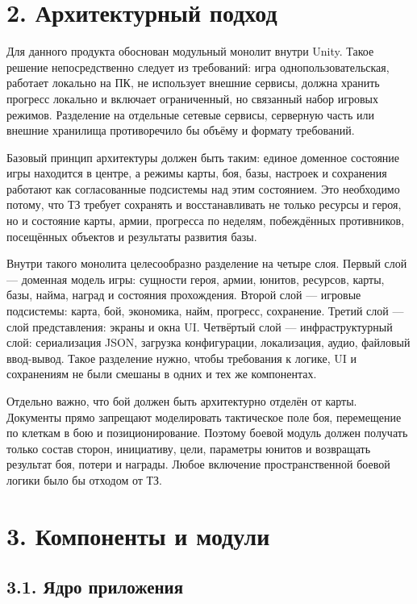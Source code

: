 \documentclass[12pt,a4paper]{article}
\begin{document}
\section*{2. Архитектурный подход}

Для данного продукта обоснован модульный монолит внутри Unity. Такое решение непосредственно следует из требований: игра однопользовательская, работает локально на ПК, не использует внешние сервисы, должна хранить прогресс локально и включает ограниченный, но связанный набор игровых режимов. Разделение на отдельные сетевые сервисы, серверную часть или внешние хранилища противоречило бы объёму и формату требований.

Базовый принцип архитектуры должен быть таким: единое доменное состояние игры находится в центре, а режимы карты, боя, базы, настроек и сохранения работают как согласованные подсистемы над этим состоянием. Это необходимо потому, что ТЗ требует сохранять и восстанавливать не только ресурсы и героя, но и состояние карты, армии, прогресса по неделям, побеждённых противников, посещённых объектов и результаты развития базы.

Внутри такого монолита целесообразно разделение на четыре слоя. Первый слой --- доменная модель игры: сущности героя, армии, юнитов, ресурсов, карты, базы, найма, наград и состояния прохождения. Второй слой --- игровые подсистемы: карта, бой, экономика, найм, прогресс, сохранение. Третий слой --- слой представления: экраны и окна UI. Четвёртый слой --- инфраструктурный слой: сериализация JSON, загрузка конфигурации, локализация, аудио, файловый ввод-вывод. Такое разделение нужно, чтобы требования к логике, UI и сохранениям не были смешаны в одних и тех же компонентах.

Отдельно важно, что бой должен быть архитектурно отделён от карты. Документы прямо запрещают моделировать тактическое поле боя, перемещение по клеткам в бою и позиционирование. Поэтому боевой модуль должен получать только состав сторон, инициативу, цели, параметры юнитов и возвращать результат боя, потери и награды. Любое включение пространственной боевой логики было бы отходом от ТЗ.

\section*{3. Компоненты и модули}

\subsection*{3.1. Ядро приложения}
\end{document}
